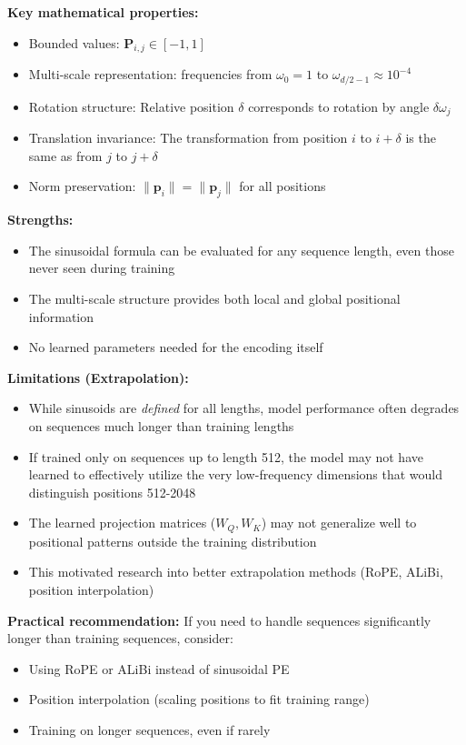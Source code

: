 \documentclass{article}
\begin{document}
\textbf{Key mathematical properties:}
\begin{itemize}
\item Bounded values: $\mathbf{P}_{i,j} \in [-1, 1]$
\item Multi-scale representation: frequencies from $\omega_0 = 1$ to $\omega_{d/2-1} \approx 10^{-4}$
\item Rotation structure: Relative position $\delta$ corresponds to rotation by angle $\delta \omega_j$
\item Translation invariance: The transformation from position $i$ to $i+\delta$ is the same as from $j$ to $j+\delta$
\item Norm preservation: $\|\mathbf{p}_i\| = \|\mathbf{p}_j\|$ for all positions
\end{itemize}

\begin{tcolorbox}[colback=yellow!5!white, colframe=orange!50!black, title=Generalization and Limitations]
\textbf{Strengths:}
\begin{itemize}
\item The sinusoidal formula can be evaluated for any sequence length, even those never seen during training
\item The multi-scale structure provides both local and global positional information
\item No learned parameters needed for the encoding itself
\end{itemize}

\textbf{Limitations (Extrapolation):}
\begin{itemize}
\item While sinusoids are \textit{defined} for all lengths, model performance often degrades on sequences much longer than training lengths
\item If trained only on sequences up to length 512, the model may not have learned to effectively utilize the very low-frequency dimensions that would distinguish positions 512-2048
\item The learned projection matrices ($W_Q, W_K$) may not generalize well to positional patterns outside the training distribution
\item This motivated research into better extrapolation methods (RoPE, ALiBi, position interpolation)
\end{itemize}

\textbf{Practical recommendation:} If you need to handle sequences significantly longer than training sequences, consider:
\begin{itemize}
\item Using RoPE or ALiBi instead of sinusoidal PE
\item Position interpolation (scaling positions to fit training range)
\item Training on longer sequences, even if rarely
\end{itemize}
\end{tcolorbox}
\end{document}
